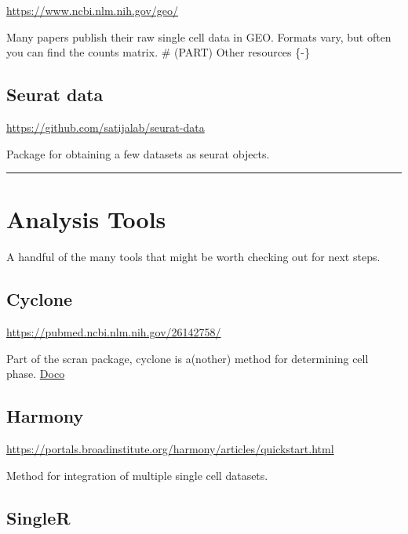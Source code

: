 \documentclass[
]{book}
\begin{document}
\url{https://www.ncbi.nlm.nih.gov/geo/}

Many papers publish their raw single cell data in GEO. Formats vary, but often you can find the counts matrix.
\# (PART) Other resources \{-\}

\subsection*{Seurat data}\label{seurat-data}

\url{https://github.com/satijalab/seurat-data}

Package for obtaining a few datasets as seurat objects.

\begin{center}\rule{0.5\linewidth}{0.5pt}\end{center}

\section{Analysis Tools}\label{analysis-tools}

A handful of the many tools that might be worth checking out for next steps.

\subsection*{Cyclone}\label{cyclone}

\url{https://pubmed.ncbi.nlm.nih.gov/26142758/}

Part of the scran package, cyclone is a(nother) method for determining cell phase.
\href{https://rdrr.io/bioc/scran/man/cyclone.html}{Doco}

\subsection*{Harmony}\label{harmony}

\url{https://portals.broadinstitute.org/harmony/articles/quickstart.html}

Method for integration of multiple single cell datasets.

\subsection*{SingleR}\label{singler-1}
\end{document}
